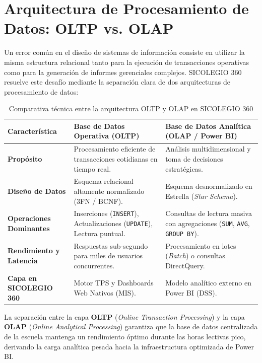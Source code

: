 \documentclass[12pt,a4paper,oneside]{report}
\begin{document}
\section{Arquitectura de Procesamiento de Datos: OLTP vs. OLAP}

Un error común en el diseño de sistemas de información consiste en utilizar la misma estructura relacional tanto para la ejecución de transacciones operativas como para la generación de informes gerenciales complejos. SICOLEGIO 360 resuelve este desafío mediante la separación clara de dos arquitecturas de procesamiento de datos:

\begin{table}[H]
\centering
\caption{Comparativa técnica entre la arquitectura OLTP y OLAP en SICOLEGIO 360}
\label{tab:oltp_vs_olap}
\small
\begin{tabularx}{\textwidth}{|p{3.5cm}|X|X|}
\hline
\textbf{Característica} & \textbf{Base de Datos Operativa (OLTP)} & \textbf{Base de Datos Analítica (OLAP / Power BI)} \\
\hline
\textbf{Propósito} & Procesamiento eficiente de transacciones cotidianas en tiempo real. & Análisis multidimensional y toma de decisiones estratégicas. \\
\hline
\textbf{Diseño de Datos} & Esquema relacional altamente normalizado (3FN / BCNF). & Esquema desnormalizado en Estrella (\textit{Star Schema}). \\
\hline
\textbf{Operaciones Dominantes} & Inserciones (\texttt{INSERT}), Actualizaciones (\texttt{UPDATE}), Lectura puntual. & Consultas de lectura masiva con agregaciones (\texttt{SUM}, \texttt{AVG}, \texttt{GROUP BY}). \\
\hline
\textbf{Rendimiento y Latencia} & Respuestas sub-segundo para miles de usuarios concurrentes. & Procesamiento en lotes (\textit{Batch}) o consultas DirectQuery. \\
\hline
\textbf{Capa en SICOLEGIO 360} & Motor TPS y Dashboards Web Nativos (MIS). & Modelo analítico externo en Power BI (DSS). \\
\hline
\end{tabularx}
\end{table}

La separación entre la capa \textbf{OLTP} (\textit{Online Transaction Processing}) y la capa \textbf{OLAP} (\textit{Online Analytical Processing}) garantiza que la base de datos centralizada de la escuela mantenga un rendimiento óptimo durante las horas lectivas pico, derivando la carga analítica pesada hacia la infraestructura optimizada de Power BI.
\end{document}
